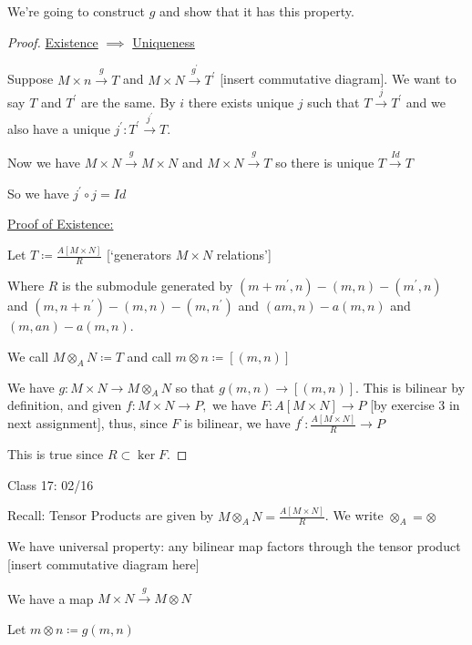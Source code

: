 \documentclass{article}
\theoremstyle{definition}
\begin{document}
We're going to construct \(g\) and show that it has this property.

\begin{proof}
    \underline{Existence} \(\implies \) \underline{Uniqueness}
    
    Suppose \(M\times n \overset{g}{\to} T\) and \(M\times N \overset{g^{\prime} }{\to} T^{\prime} \) [insert commutative diagram]. We want to say \(T\) and \(T^{\prime} \) are the same. By \(i\) there exists unique \(j\) such that \(T \overset{j}{\to } T^{\prime} \) and we also have a unique \(j^{\prime} : T^{\prime} \overset{j^{\prime} }{\to} T\).

    Now we have \(M\times N \overset{g}{\to} M\times N\) and \(M\times N \overset{g}{\to} T\) so there is unique \(T \overset{Id}{\to} T\) 
    
    So we have \(j^{\prime} \circ j = Id\) 

    \underline{Proof of Existence:}

    Let \(T\coloneqq \frac{A[M\times N]}{R}\) [`generators \(M\times N\) relations']

    Where \(R\) is the submodule generated by \((m+m^{\prime} ,n)-(m,n)-(m^{\prime} ,n)\) and \((m,n + n^{\prime} ) - (m,n) - (m,n^{\prime})\) and \((am,n) - a(m,n)\) and \((m,an) - a(m,n)\).
    
    We call \(M \otimes _A N \coloneqq T\) and call \(m \otimes n \coloneqq [(m,n)]\) 

    We have \(g:M\times N \to M \otimes _A N\) so that \(g(m,n) \to [(m,n)]\). This is bilinear by definition, and given \(f: M\times N \to P,\) we have \(F: A[M\times N]\to P\) [by exercise 3 in next assignment], thus, since \(F\) is bilinear, we have \(f^{\prime} :\frac{A[M\times N]}{R}\to P\) 

    This is true since \(R \subset \ker F\).

\end{proof}

\hrulefill

Class 17: 02/16

Recall: Tensor Products are given by \(M \otimes_A N = \frac{A[M \times N]}{R}\). We write \(\otimes_A = \otimes\) 

We have universal property: any bilinear map factors through the tensor product [insert commutative diagram here]

We have a map \(M\times N \overset{g}{\to}  M \otimes N\) 

Let \(m\otimes n \coloneqq g(m,n)\) 
\end{document}
